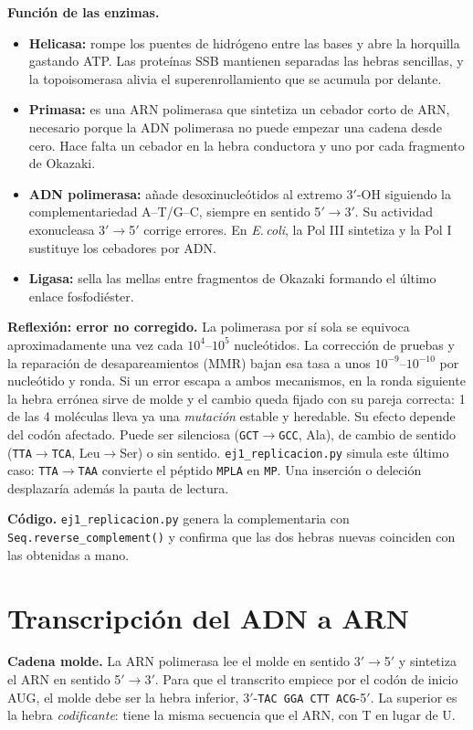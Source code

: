 \documentclass[11pt,a4paper]{article}
\newcommand{\sq}[1]{\texttt{#1}}
\begin{document}
\textbf{Función de las enzimas.}
\begin{itemize}
\item \textbf{Helicasa:} rompe los puentes de hidrógeno entre las bases y abre la horquilla gastando ATP. Las proteínas SSB mantienen separadas las hebras sencillas, y la topoisomerasa alivia el superenrollamiento que se acumula por delante.
\item \textbf{Primasa:} es una ARN polimerasa que sintetiza un cebador corto de ARN, necesario porque la ADN polimerasa no puede empezar una cadena desde cero. Hace falta un cebador en la hebra conductora y uno por cada fragmento de Okazaki.
\item \textbf{ADN polimerasa:} añade desoxinucleótidos al extremo 3$'$-OH siguiendo la complementariedad A--T/G--C, siempre en sentido 5$'\!\to$3$'$. Su actividad exonucleasa 3$'\!\to$5$'$ corrige errores. En \textit{E.\,coli}, la Pol III sintetiza y la Pol I sustituye los cebadores por ADN.
\item \textbf{Ligasa:} sella las mellas entre fragmentos de Okazaki formando el último enlace fosfodiéster.
\end{itemize}

\textbf{Reflexión: error no corregido.} La polimerasa por sí sola se equivoca aproximadamente una vez cada $10^4$--$10^5$ nucleótidos. La corrección de pruebas y la reparación de desapareamientos (MMR) bajan esa tasa a unos $10^{-9}$--$10^{-10}$ por nucleótido y ronda. Si un error escapa a ambos mecanismos, en la ronda siguiente la hebra errónea sirve de molde y el cambio queda fijado con su pareja correcta: 1 de las 4 moléculas lleva ya una \emph{mutación} estable y heredable. Su efecto depende del codón afectado. Puede ser silenciosa (\sq{GCT}$\to$\sq{GCC}, Ala), de cambio de sentido (\sq{TTA}$\to$\sq{TCA}, Leu$\to$Ser) o sin sentido. \sq{ej1\_replicacion.py} simula este último caso: \sq{TTA}$\to$\sq{TAA} convierte el péptido \sq{MPLA} en \sq{MP}. Una inserción o deleción desplazaría además la pauta de lectura.

\textbf{Código.} \sq{ej1\_replicacion.py} genera la complementaria con \sq{Seq.reverse\_complement()} y confirma que las dos hebras nuevas coinciden con las obtenidas a mano.

\section{Transcripción del ADN a ARN}
\textbf{Cadena molde.} La ARN polimerasa lee el molde en sentido 3$'\!\to$5$'$ y sintetiza el ARN en sentido 5$'\!\to$3$'$. Para que el transcrito empiece por el codón de inicio AUG, el molde debe ser la hebra inferior, 3$'$-\sq{TAC GGA CTT ACG}-5$'$. La superior es la hebra \emph{codificante}: tiene la misma secuencia que el ARN, con T en lugar de U.
\end{document}
